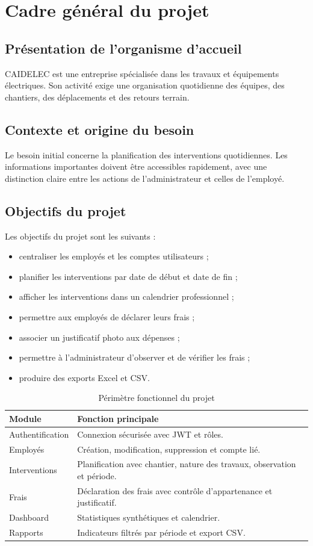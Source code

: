\documentclass[12pt,a4paper,oneside]{report}
\begin{document}
\chapter{Cadre général du projet}
\section{Présentation de l'organisme d'accueil}
CAIDELEC est une entreprise spécialisée dans les travaux et équipements électriques. Son activité exige une organisation quotidienne des équipes, des chantiers, des déplacements et des retours terrain.

\section{Contexte et origine du besoin}
Le besoin initial concerne la planification des interventions quotidiennes. Les informations importantes doivent être accessibles rapidement, avec une distinction claire entre les actions de l'administrateur et celles de l'employé.

\section{Objectifs du projet}
Les objectifs du projet sont les suivants :
\begin{itemize}
  \item centraliser les employés et les comptes utilisateurs ;
  \item planifier les interventions par date de début et date de fin ;
  \item afficher les interventions dans un calendrier professionnel ;
  \item permettre aux employés de déclarer leurs frais ;
  \item associer un justificatif photo aux dépenses ;
  \item permettre à l'administrateur d'observer et de vérifier les frais ;
  \item produire des exports Excel et CSV.
\end{itemize}

\begin{table}[H]
\centering
\caption{Périmètre fonctionnel du projet}
\begin{tabular}{p{4cm}p{9cm}}
\toprule
\textbf{Module} & \textbf{Fonction principale}\\
\midrule
Authentification & Connexion sécurisée avec JWT et rôles.\\
Employés & Création, modification, suppression et compte lié.\\
Interventions & Planification avec chantier, nature des travaux, observation et période.\\
Frais & Déclaration des frais avec contrôle d'appartenance et justificatif.\\
Dashboard & Statistiques synthétiques et calendrier.\\
Rapports & Indicateurs filtrés par période et export CSV.\\
\bottomrule
\end{tabular}
\end{table}
\end{document}
